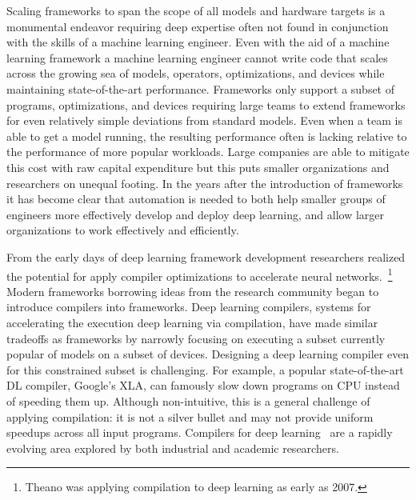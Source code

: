 Scaling frameworks to span the scope of all models and hardware targets is a monumental endeavor
  requiring deep expertise often not found in conjunction with the skills of a
  machine learning engineer.
Even with the aid of a machine learning framework a machine learning engineer
  cannot write code that scales across the growing sea of
  models, operators, optimizations, and devices while maintaining state-of-the-art performance.
Frameworks only support a subset of programs, optimizations, and devices
  requiring large teams to extend frameworks for even relatively simple deviations
  from standard models.
Even when a team is able to get a model running, the resulting performance often
  is lacking relative to the performance of more popular workloads.
Large companies are able to mitigate this cost with raw capital expenditure
  but this puts smaller organizations and researchers on unequal footing.
In the years after the introduction of frameworks it has become clear
  that automation is needed to both help smaller groups of engineers
  more effectively develop and deploy deep learning, and allow larger
  organizations to work effectively and efficiently.

From the early days of deep learning framework development researchers realized the
  potential for apply compiler optimizations to accelerate neural networks.~\footnote{Theano was applying
  compilation to deep learning as early as 2007.}
Modern frameworks borrowing ideas from the research community
  began to introduce compilers into frameworks.
Deep learning compilers, systems for accelerating the execution deep learning via compilation,
 have made similar tradeoffs as frameworks by narrowly focusing on executing a subset
 currently popular of models on a subset of devices.
Designing a deep learning compiler even for this constrained subset is challenging.
For example,
  a popular state-of-the-art DL compiler,
  Google's XLA, can famously slow down programs on
  CPU instead of speeding them up.
Although non-intuitive, this is a general challenge of applying compilation:
  it is not a silver bullet and may not provide uniform speedups across all input programs.
Compilers for deep learning~\citep{xla,jax,glow,tvm_osdi18,myia,fluxjl,lattner2020mlir} are
  a rapidly evolving area explored by both industrial and academic researchers.

